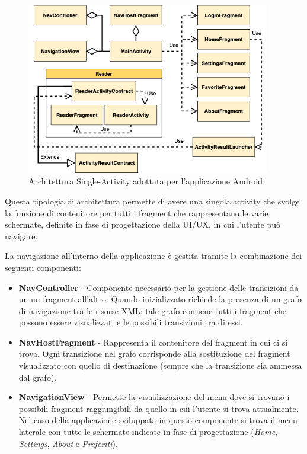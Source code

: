 \begin{figure}[H]
    \centering
    \includegraphics[width=0.95\textwidth]{img/android-arch.png}
    \caption{Architettura Single-Activity adottata per l'applicazione Android}
    \label{android-arch-png}
\end{figure}

Questa tipologia di architettura permette di avere una singola activity che svolge la funzione di contenitore per tutti i fragment che rappresentano le varie schermate, definite in fase di progettazione della UI/UX, in cui l'utente può navigare.

La navigazione all'interno della applicazione è gestita tramite la combinazione dei seguenti componenti:
\begin{itemize}
    \item \textbf{NavController} - Componente necessario per la gestione delle transizioni da un un fragment all'altro. Quando inizializzato richiede la presenza di un grafo di navigazione tra le risorse XML: tale grafo contiene tutti i fragment che possono essere visualizzati e le possibili transizioni tra di essi.
    \item \textbf{NavHostFragment} - Rappresenta il contenitore del fragment in cui ci si trova. Ogni transizione nel grafo corrisponde alla sostituzione del fragment visualizzato con quello di destinazione (sempre che la transizione sia ammessa dal grafo).
    \item \textbf{NavigationView} - Permette la visualizzazione del menu dove si trovano i possibili fragment raggiungibili da quello in cui l'utente si trova attualmente. Nel caso della applicazione sviluppata in questo componente si trova il menu laterale con tutte le schermate indicate in fase di progettazione (\textit{Home}, \textit{Settings}, \textit{About} e \textit{Preferiti}).
\end{itemize}

